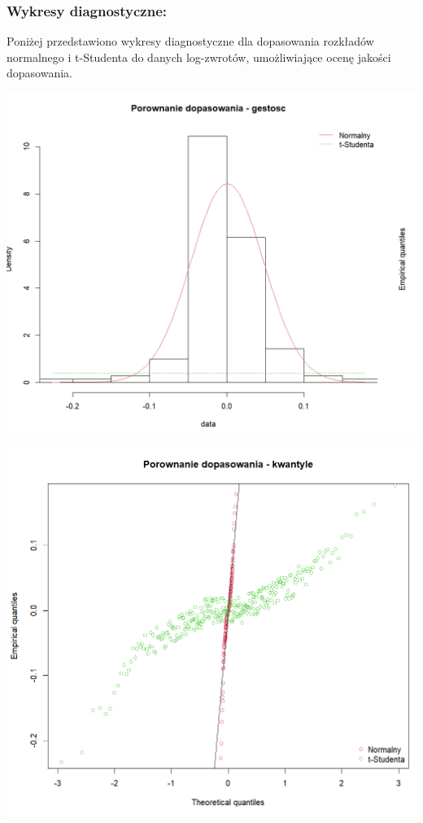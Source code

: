 \documentclass[a4paper,11pt]{article}
\begin{document}
\subsubsection{Wykresy diagnostyczne:}

Poniżej przedstawiono wykresy diagnostyczne dla dopasowania rozkładów normalnego i t-Studenta do danych log-zwrotów, umożliwiające ocenę jakości dopasowania.

\centerline{\includegraphics[width=14cm]{./Janek/dopasowanie gestosc.png}}
\centerline{\includegraphics[width=14cm]{./Janek/dopasowanie kwantyle.png}} 
\end{document}
